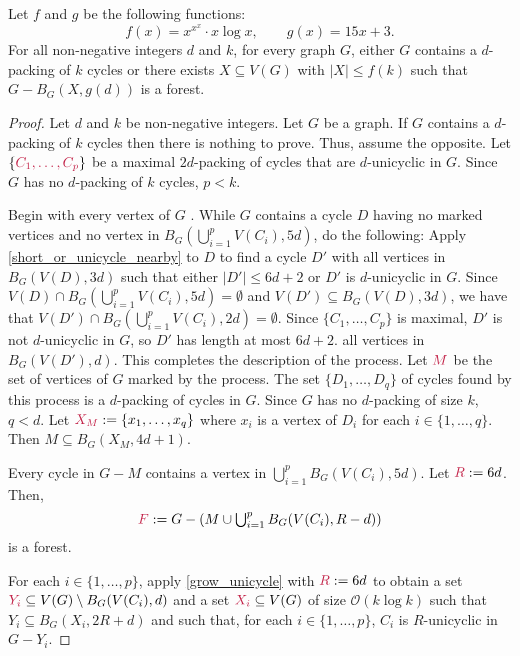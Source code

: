 \documentclass{patmorin}
\newcommand{\Oh}{\mathcal{O}}
\DeclarePairedDelimiter\set{\{}{\}}
\begin{document}
\begin{thm}\label{thm:the-big-ball-of-wax}
Let $f$ and $g$ be the following functions:
\[
f(x)= x^{x^x}\cdot x\log x,\qquad 
g(x)= 15x +3.
\]
For all non-negative integers $d$ and $k$, for every graph $G$, 
either $G$ contains a $d$-packing of $k$ cycles or 
there exists $X\subseteq V(G)$ with $|X|\leq f(k)$ such that
$G-B_G(X,g(d))$ is a forest.
\end{thm}

\begin{proof}
Let $d$ and $k$ be non-negative integers. 
Let $G$ be a graph.
If $G$ contains a $d$-packing of $k$ cycles then there is nothing to prove. 
Thus, assume the opposite. 
Let $\set{\mathdefin{C_1,\ldots,C_p}}$ be a maximal $2d$-packing of cycles that are $d$-unicyclic in $G$.  Since $G$ has no $d$-packing of $k$ cycles, $p<k$.

Begin with every vertex of $G$ .  While $G$ contains a cycle $D$ having no marked vertices and no vertex in $B_G(\bigcup_{i=1}^p V(C_i),5d)$, do the following:  Apply \cref{short_or_unicycle_nearby} to $D$ to find a cycle $D'$ with all vertices in  $B_G(V(D),3d)$ such that either $|D'|\leq 6d+2$ or $D'$ is $d$-unicyclic in $G$. Since $V(D)\cap B_G(\bigcup_{i=1}^p V(C_i),5d)=\emptyset$ and $V(D')\subseteq B_G(V(D),3d)$, we have that $V(D')\cap B_G(\bigcup_{i=1}^p V(C_i),2d)=\emptyset$. Since $\{C_1,\ldots,C_p\}$ is maximal, $D'$ is not $d$-unicyclic in $G$, so $D'$ has length at most $6d+2$.   all vertices in $B_G(V(D'),d)$.  
This completes the description of the process.  Let $\mathdefin{M}$ be the set of vertices of $G$ marked by the process.  The set $\{D_1,\ldots,D_{q}\}$ of cycles found by this process is a $d$-packing of cycles in $G$.  Since $G$ has no $d$-packing of size $k$, $q<d$. Let $\mathdefin{X_M}:=\{x_1,\ldots,x_{q}\}$ where  $x_i$ is a vertex of $D_i$ for each $i\in\{1,\ldots,q\}$. Then $M\subseteq B_G(X_M,4d+1)$.

Every cycle in $G-M$ contains a vertex in $\bigcup_{i=1}^p B_G(V(C_i),5d)$.
Let $\mathdefin{R}:=6d$.
Then, 
\[
\textstyle\mathdefin{F}:=G-\left(M\cup \bigcup_{i=1}^p B_G(V(C_i),R-d)\right)
\]
is a forest.


For each $i\in\{1,\ldots,p\}$, apply \cref{grow_unicycle} with $\mathdefin{R}:=6d$ to obtain a set $\mathdefin{Y_i}\subseteq V(G)\setminus B_G(V(C_i),d)$ and a set $\mathdefin{X_i}\subseteq V(G)$ of size $\Oh(k\log k)$ such that $Y_i\subseteq B_G(X_i,2R+d)$ and such that, for each $i\in\{1,\ldots,p\}$, $C_i$ is $R$-unicyclic in $G-Y_i$.


\end{proof}
\end{document}
